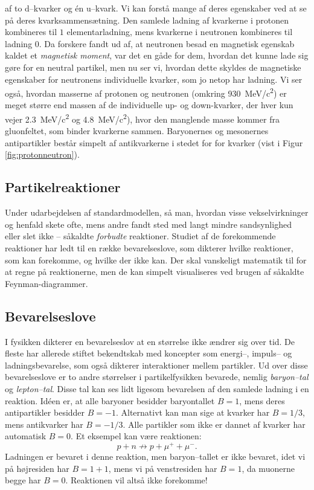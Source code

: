 af to d--kvarker og én u--kvark. Vi kan forstå mange af deres egenskaber
ved at se på deres kvarksammensætning. Den samlede ladning af
kvarkerne i protonen kombineres til $1$ elementarladning, mens
kvarkerne i neutronen kombineres til ladning 0. Da forskere fandt ud
af, at neutronen besad en magnetisk egenskab kaldet et \emph{magnetisk
  moment}, var det en gåde for dem, hvordan det kunne lade sig gøre
for en neutral partikel, men nu ser vi, hvordan dette skyldes de
magnetiske egenskaber for neutronens individuelle kvarker, som jo
netop har ladning. Vi ser også, hvordan masserne af protonen og
neutronen (omkring \SI{930}{MeV/c^2}) er meget større end massen af de
individuelle up- og down-kvarker, der hver kun vejer \SI{2,3}{MeV/c^2}
og \SI{4,8}{MeV/c^2}), hvor den manglende masse kommer fra
gluonfeltet, som binder kvarkerne sammen. Baryonernes og mesonernes
antipartikler består simpelt af antikvarkerne i stedet for for kvarker
(vist i Figur \ref{fig:protonneutron}).

\subsection{Partikelreaktioner}
Under udarbejdelsen af standardmodellen, så man, hvordan visse
vekselvirkninger og henfald skete ofte, mens andre fandt sted med
langt mindre sandsynlighed eller slet ikke -- såkaldte \emph{forbudte}
reaktioner. Studiet af de forekommende reaktioner har ledt til en
række bevarelseslove, som dikterer hvilke reaktioner, som kan
forekomme, og hvilke der ikke kan. Der skal vanskeligt matematik til
for at regne på reaktionerne, men de kan simpelt visualiseres ved
brugen af såkaldte Feynman-diagrammer.
 
\subsection{Bevarelseslove}
I fysikken dikterer en bevarelseslov at en størrelse ikke ændrer sig
over tid. De fleste har allerede stiftet bekendtskab med koncepter som
energi--, impuls-- og ladningsbevarelse, som også dikterer interaktioner
mellem partikler. Ud over disse bevarelseslove er to andre størrelser
i partikelfysikken bevarede, nemlig \emph{baryon--tal} og
\emph{lepton--tal}. Disse tal kan ses lidt ligesom bevarelsen af den
samlede ladning i en reaktion. Idéen er, at alle baryoner besidder
baryontallet $B=1$, mens deres antipartikler besidder
$B=-1$. Alternativt kan man sige at kvarker har $B=1/3$, mens
antikvarker har $B=-1/3$. Alle partikler som ikke er dannet af kvarker
har automatisk $B=0$. Et eksempel kan være reaktionen:
\begin{equation*}
p + n \not\rightarrow p + \mu^+ + \mu^- .
\end{equation*}
Ladningen er bevaret i denne reaktion, men baryon--tallet er ikke
bevaret, idet vi på højresiden har $B=1+1$, mens vi på venstresiden
har $B=1$, da muonerne begge har $B=0$. Reaktionen vil altså ikke
forekomme!


